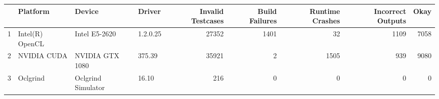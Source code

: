 \begin{tabular}{llllrrrrr}
\toprule
{} &         Platform &              Device &    Driver &  Invalid Testcases &  Build Failures &  Runtime Crashes &  Incorrect Outputs &  Okay \\
\midrule
1 &  Intel(R) OpenCL &       Intel E5-2620 &  1.2.0.25 &              27352 &            1401 &               32 &               1109 &  7058 \\
2 &      NVIDIA CUDA &     NVIDIA GTX 1080 &    375.39 &              35921 &               2 &             1505 &                939 &  9080 \\
3 &         Oclgrind &  Oclgrind Simulator &     16.10 &                216 &               0 &                0 &                  0 &     0 \\
\bottomrule
\end{tabular}
